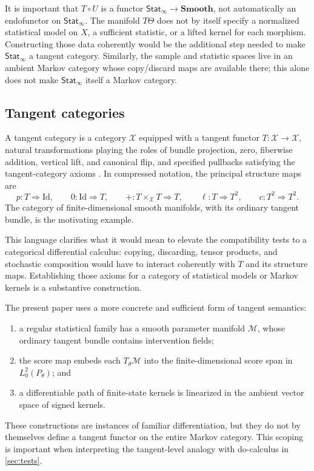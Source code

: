 \documentclass{article}
\theoremstyle{plain}
\theoremstyle{definition}
\theoremstyle{remark}
\newcommand{\M}{\mathcal M}
\newcommand{\StatInf}{\mathsf{Stat}_{\infty}}
\begin{document}
It is important that \(T\circ U\) is a functor
\(\StatInf\to\mathbf{Smooth}\), not automatically an endofunctor on
\(\StatInf\).  The manifold \(T\Theta\) does not by itself specify a normalized
statistical model on \(X\), a sufficient statistic, or a lifted kernel for each
morphism.  Constructing those data coherently would be the additional step
needed to make \(\StatInf\) a tangent category.  Similarly, the sample and
statistic spaces live in an ambient Markov category whose copy/discard maps are
available there; this alone does not make \(\StatInf\) itself a Markov category.

\subsection{Tangent categories}

A tangent category is a category \(\mathcal X\) equipped with a tangent functor
\(T:\mathcal X\to\mathcal X\), natural transformations playing the roles of
bundle projection, zero, fiberwise addition, vertical lift, and canonical flip,
and specified pullbacks satisfying the tangent-category axioms
\citep{rosicky1984abstract,cockett2014differential}.  In compressed notation,
the principal structure maps are
\[
  p:T\Rightarrow\mathrm{Id},
  \qquad
  0:\mathrm{Id}\Rightarrow T,
  \qquad
  +:T\times_{\mathcal X}T\Rightarrow T,
  \qquad
  \ell:T\Rightarrow T^2,
  \qquad
  c:T^2\Rightarrow T^2.
\]
The category of finite-dimensional smooth manifolds, with its ordinary tangent
bundle, is the motivating example.

This language clarifies what it would mean to elevate the compatibility tests
to a categorical differential calculus: copying, discarding, tensor products,
and stochastic composition would have to interact coherently with \(T\) and
its structure maps.  Establishing those axioms for a category of statistical
models or Markov kernels is a substantive construction.

The present paper uses a more concrete and sufficient form of tangent
semantics:
\begin{enumerate}[leftmargin=*,itemsep=2pt]
  \item a regular statistical family has a smooth parameter manifold
        \(\M\), whose ordinary tangent bundle contains intervention fields;
  \item the score map embeds each \(T_\theta\M\) into the finite-dimensional
        score span in \(L_0^2(P_\theta)\); and
  \item a differentiable path of finite-state kernels is linearized in the
        ambient vector space of signed kernels.
\end{enumerate}
These constructions are instances of familiar differentiation, but they do not
by themselves define a tangent functor on the entire Markov category.  This
scoping is important when interpreting the tangent-level analogy with
do-calculus in \cref{sec:tests}.
\end{document}
